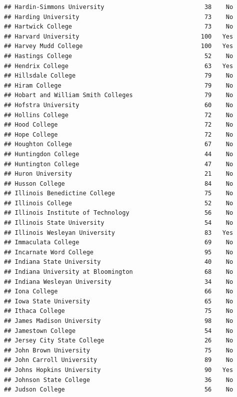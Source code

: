 \documentclass[
]{article}
\begin{document}
\begin{verbatim}
## Hardin-Simmons University                            38    No
## Harding University                                   73    No
## Hartwick College                                     73    No
## Harvard University                                  100   Yes
## Harvey Mudd College                                 100   Yes
## Hastings College                                     52    No
## Hendrix College                                      63   Yes
## Hillsdale College                                    79    No
## Hiram College                                        79    No
## Hobart and William Smith Colleges                    79    No
## Hofstra University                                   60    No
## Hollins College                                      72    No
## Hood College                                         72    No
## Hope College                                         72    No
## Houghton College                                     67    No
## Huntingdon College                                   44    No
## Huntington College                                   47    No
## Huron University                                     21    No
## Husson College                                       84    No
## Illinois Benedictine College                         75    No
## Illinois College                                     52    No
## Illinois Institute of Technology                     56    No
## Illinois State University                            54    No
## Illinois Wesleyan University                         83   Yes
## Immaculata College                                   69    No
## Incarnate Word College                               95    No
## Indiana State University                             40    No
## Indiana University at Bloomington                    68    No
## Indiana Wesleyan University                          34    No
## Iona College                                         66    No
## Iowa State University                                65    No
## Ithaca College                                       75    No
## James Madison University                             98    No
## Jamestown College                                    54    No
## Jersey City State College                            26    No
## John Brown University                                75    No
## John Carroll University                              89    No
## Johns Hopkins University                             90   Yes
## Johnson State College                                36    No
## Judson College                                       56    No

\end{verbatim}
\end{document}
